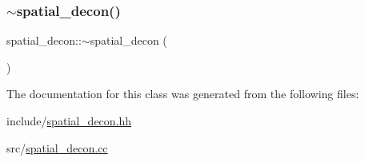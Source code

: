 \mbox{\label{classspatial__decon_afcb56f288ca1a562f1692ffd22b2e0c7}} 
\subsubsection{\texorpdfstring{$\sim$spatial\+\_\+decon()}{~spatial\_decon()}}
{\footnotesize\ttfamily spatial\+\_\+decon\+::$\sim$spatial\+\_\+decon (\begin{DoxyParamCaption}{ }\end{DoxyParamCaption})}



The documentation for this class was generated from the following files\+:\begin{DoxyCompactItemize}
\item 
include/\mbox{\hyperlink{spatial__decon_8hh}{spatial\+\_\+decon.\+hh}}\item 
src/\mbox{\hyperlink{spatial__decon_8cc}{spatial\+\_\+decon.\+cc}}\end{DoxyCompactItemize}
